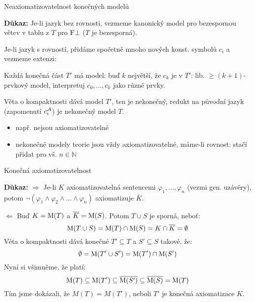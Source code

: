 \documentclass{beamer}
\begin{document}
\begin{frame}{Neaxiomatizovatelnost konečných modelů}

    \smallskip


    \textbf{Důkaz:}
    \alert{Je-li jazyk bez rovnosti,} vezmeme  kanonický model pro bezespornou větev v tablu z $T$ pro $\mathrm{F}\bot$ ($T$ je bezesporná).
    
    \alert{Je-li jazyk s rovností,} přidáme spočetně mnoho nových konst. symbolů $c_i$ a vezmeme extenzi: 

    Každá \alert{konečná část} $T'$ má model: buď $k$ největší, že $c_k$ je v $T'$: lib. $\geq(k+1)$-prvkový model, interpretuj $c_0,\dots,c_k$ jako různé prvky.

    \alert{Věta o kompaktnosti} dává model $T'$, ten je nekonečný, redukt na původní jazyk (zapomenutí $c_i^{\mathcal{A}}$) je nekonečný model $T$.\hfill\qedsymbol

    \begin{itemize}
        \item např.  nejsou axiomatizovatelné
        \item \alert{nekonečné modely} teorie jsou vždy axiomatizovatelné, máme-li rovnost: stačí přidat  pro vš. $n\in\mathbb N$
    \end{itemize}

\end{frame}


\begin{frame}{Konečná axiomatizovatelnost}
    
    \smallskip


    \textbf{Důkaz:} \alert{\Large$\Rightarrow$}
    Je-li $K$ axiomatizovatelná \alert{sentencemi} $\varphi_1,\dots,\varphi_n$ (vezmi gen. uzávěry), potom $\neg(\varphi_1\land\varphi_2\land\dots\land\varphi_n)$ axiomatizuje $\overline{K}$.

    \alert{\Large$\Leftarrow$} Buď $K=\operatorname{M}(T)$ a $\overline{K}=\operatorname{M}(S)$. Potom  \alert{$T\cup S$ je sporná}, neboť:
    $$
    \operatorname{M}(T\cup S)=\operatorname{M}(T)\cap \operatorname{M}(S)=K\cap\overline{K}=\emptyset
    $$
    \alert{Věta o kompaktnosti} dává konečné $T'\subseteq T$ a $S'\subseteq S$ takové, že:
    $$
    \emptyset = \operatorname{M}(T'\cup S')=\operatorname{M}(T')\cap \operatorname{M}(S')
    $$
    Nyní si všimněme, že platí:
    $$
    \operatorname{M}(T)\subseteq \operatorname{M}(T')\subseteq \overline{\operatorname{M}(S')}\subseteq \overline{\operatorname{M}(S)}=\operatorname{M}(T)
    $$
    Tím jsme dokázali, že \alert{$M(T)=M(T')$}, neboli $T'$ je konečná axiomatizace $K$. \hfill\qedsymbol

\end{frame}
\end{document}
